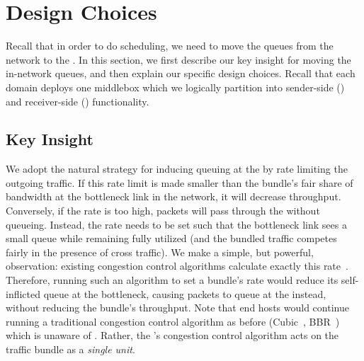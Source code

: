 \section{Design Choices}\label{s:design}
%

Recall that in order to do scheduling, we need to move the queues from the network to the \name. 
In this section, we first describe our key insight for moving the in-network queues, and then explain our specific design choices. 
Recall that each domain deploys one \name middlebox which we logically partition into sender-side (\inbox) and receiver-side (\outbox) functionality.

\subsection{Key Insight}\label{s:design:key}
We adopt the natural strategy for inducing queuing at the \inbox by rate limiting the outgoing traffic. 
If this rate limit is made smaller than the bundle's fair share of bandwidth at the bottleneck link in the network, it will decrease throughput. 
Conversely, if the rate is too high, packets will pass through the \inbox without queueing.
Instead, the rate needs to be set such that the bottleneck link sees a small queue while remaining fully utilized (and the bundled traffic competes fairly in the presence of cross traffic). 
We make a simple, but powerful, observation: existing congestion control algorithms calculate exactly this rate~\cite{Jacobson88}. 
Therefore, running such an algorithm to set a bundle's rate would reduce its self-inflicted queue at the bottleneck, causing packets to queue at the \inbox instead, without reducing the bundle's throughput.
Note that end hosts would continue running a traditional congestion control algorithm as before (\eg Cubic~\cite{cubic}, BBR~\cite{bbr}) which is unaware of \name.
Rather, the \inbox's congestion control algorithm acts on the traffic bundle as a \emph{single unit}.


